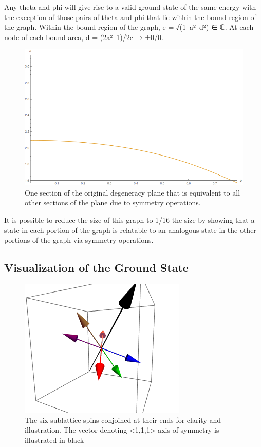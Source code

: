Any theta and phi will give rise to a valid ground state of the same energy with the exception of those pairs of theta and phi that lie within the bound region of the graph. Within the bound region of the graph, e = √(1–a²–d²) ∈ ℂ. At each node of each bound area, d = (2a²–1)/2c → ±0/0.

\begin{figure}
	\includegraphics[width=\linewidth]{img/degeneracyplane.png}
	\caption{One section of the original degeneracy plane that is equivalent to all other sections of the plane due to symmetry operations.}
	\label{fig:degenplane}
\end{figure}

It is possible to reduce the size of this graph to 1/16 the size by showing that a state in each portion of the graph is relatable to an analogous state in the other portions of the graph via symmetry operations.
\clearpage

\subsection{Visualization of the Ground State}
\begin{figure}[ht]
	\includegraphics[scale=1.2]{img/samplegs.png}
	\caption{The six sublattice spins conjoined at their ends for clarity and illustration. The vector denoting <1,1,1> axis of symmetry is illustrated in black}
	\label{fig:sampgs}
\end{figure}

